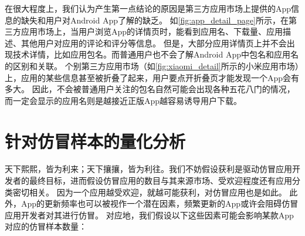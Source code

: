 在很大程度上，我们认为产生第一点结论的原因是第三方应用市场上提供的App信息的缺失和用户对Android App了解的缺乏。
如\autoref{fig:app_detail_page}所示，在第三方应用市场上，当用户浏览App的详情页时，能看到应用名、下载量、应用描述、其他用户对应用的评论和评分等信息。
但是，大部分应用详情页上并不会出现技术详情，比如应用包名。而普通用户也不会了解Android App中包名和应用名的区别和关联。
个别第三方应用市场（如\autoref{fig:xiaomi_detail}所示的小米应用市场）上，应用的某些信息甚至被折叠了起来，用户要点开折叠页才能发现一个App会有多大。
因此，不会被普通用户关注的包名自然可能会出现各种五花八门的情况，而一定会显示的应用名则是越接近正版App越容易诱导用户下载。

\vspace{5mm}
\noindent{}

\section{针对仿冒样本的量化分析}
天下熙熙，皆为利来；天下攘攘，皆为利往。我们不妨假设获利是驱动仿冒应用开发者的最终目标，进而假设仿冒应用的数目与其来源市场、受欢迎程度还有应用分类密切相关。
因为一个应用越受欢迎，就越可能获利，对仿冒应用也是如此。
此外，App的更新频率也可以被视作一个潜在因素，频繁更新的App或许会阻碍仿冒应用开发者对其进行仿冒。
对应地，我们假设以下这些因素可能会影响某款App对应的仿冒样本数量：

